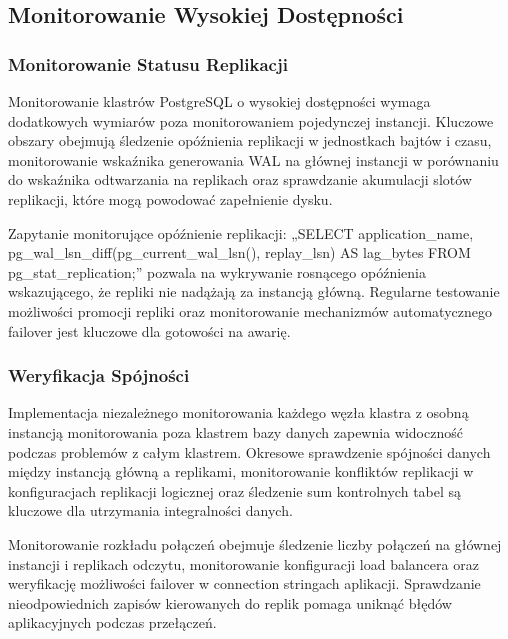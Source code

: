 \documentclass[letterpaper,10pt,polish]{sphinxmanual}
\begin{document}
\subsection{Monitorowanie Wysokiej Dostępności}
\label{\detokenize{rozdzial2/repo-wspolne/index:monitorowanie-wysokiej-dostepnosci}}

\subsubsection{Monitorowanie Statusu Replikacji}
\label{\detokenize{rozdzial2/repo-wspolne/index:monitorowanie-statusu-replikacji}}
\sphinxAtStartPar
Monitorowanie klastrów PostgreSQL o wysokiej dostępności wymaga dodatkowych wymiarów poza monitorowaniem pojedynczej instancji. Kluczowe obszary obejmują śledzenie opóźnienia replikacji w jednostkach bajtów i czasu, monitorowanie wskaźnika generowania WAL na głównej instancji w porównaniu do wskaźnika odtwarzania na replikach oraz sprawdzanie akumulacji slotów replikacji, które mogą powodować zapełnienie dysku.

\sphinxAtStartPar
Zapytanie monitorujące opóźnienie replikacji: „SELECT application\_name, pg\_wal\_lsn\_diff(pg\_current\_wal\_lsn(), replay\_lsn) AS lag\_bytes FROM pg\_stat\_replication;” pozwala na wykrywanie rosnącego opóźnienia wskazującego, że repliki nie nadążają za instancją główną. Regularne testowanie możliwości promocji repliki oraz monitorowanie mechanizmów automatycznego failover jest kluczowe dla gotowości na awarię.


\subsubsection{Weryfikacja Spójności}
\label{\detokenize{rozdzial2/repo-wspolne/index:weryfikacja-spojnosci}}
\sphinxAtStartPar
Implementacja niezależnego monitorowania każdego węzła klastra z osobną instancją monitorowania poza klastrem bazy danych zapewnia widoczność podczas problemów z całym klastrem. Okresowe sprawdzenie spójności danych między instancją główną a replikami, monitorowanie konfliktów replikacji w konfiguracjach replikacji logicznej oraz śledzenie sum kontrolnych tabel są kluczowe dla utrzymania integralności danych.

\sphinxAtStartPar
Monitorowanie rozkładu połączeń obejmuje śledzenie liczby połączeń na głównej instancji i replikach odczytu, monitorowanie konfiguracji load balancera oraz weryfikację możliwości failover w connection stringach aplikacji. Sprawdzanie nieodpowiednich zapisów kierowanych do replik pomaga uniknąć błędów aplikacyjnych podczas przełączeń.
\end{document}
